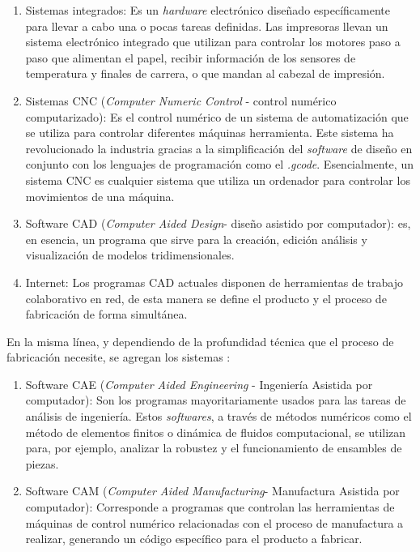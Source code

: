  \begin{enumerate}
 	
	\item Sistemas integrados: Es un \textit{hardware} electrónico diseñado específicamente para llevar a cabo una o pocas tareas definidas. Las impresoras llevan un sistema electrónico integrado que utilizan para controlar los motores paso a paso que alimentan el papel, recibir información de los sensores de temperatura y finales de carrera, o que mandan al cabezal de impresión.
	\item Sistemas CNC (\textit{Computer Numeric Control} - control numérico computarizado): Es el control numérico de un sistema de automatización que se utiliza para controlar diferentes máquinas herramienta. Este sistema ha revolucionado la industria gracias a la simplificación del \textit{software} de diseño en conjunto con los lenguajes de programación como el \textit{.gcode}. Esencialmente, un sistema CNC es cualquier sistema que utiliza un ordenador para controlar los movimientos de una máquina.
	\item Software CAD (\textit{Computer Aided Design}- diseño asistido por computador): es, en esencia, un programa que sirve para la creación, edición análisis y visualización de modelos tridimensionales.  
	\item Internet: Los programas CAD actuales disponen de herramientas de trabajo colaborativo en red, de esta manera se define el producto y el proceso de fabricación de forma simultánea.\\

  \end{enumerate}

En la misma línea, y dependiendo de la profundidad técnica que el proceso de fabricación necesite, se agregan los sistemas \citep{leao2017}:

\begin{enumerate}
	\item Software CAE (\textit{Computer Aided Engineering} - Ingeniería Asistida por computador): Son los programas mayoritariamente usados para las tareas de análisis de ingeniería. Estos \textit{softwares}, a través de métodos numéricos como el método de elementos finitos o dinámica de fluidos computacional, se utilizan para, por ejemplo, analizar la robustez y el funcionamiento de ensambles de piezas.
	\item Software CAM (\textit{Computer Aided Manufacturing}- Manufactura Asistida por computador): Corresponde a programas que controlan las herramientas de máquinas de control numérico relacionadas con el proceso de manufactura a realizar, generando un código específico para el producto a fabricar. 

\end{enumerate}

